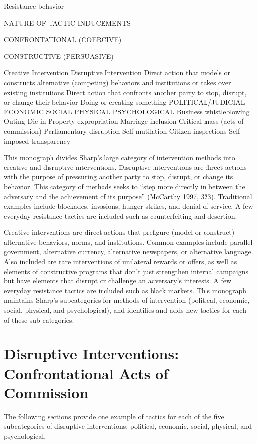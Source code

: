 \documentclass[twoside,a4paper,12pt,fleqn,openany]{extbook}
\begin{document}
Resistance behavior

NATURE OF TACTIC INDUCEMENTS

CONFRONTATIONAL (COERCIVE)

CONSTRUCTIVE (PERSUASIVE)

Creative Intervention
Disruptive Intervention
Direct action that models or constructs alternative (competing) behaviors and institutions or takes over existing institutions
Direct action that confronts another party to stop, disrupt, or change their behavior
Doing or creating something
POLITICAL/JUDICIAL
ECONOMIC
SOCIAL
PHYSICAL
PSYCHOLOGICAL
Business whistleblowing
Outing
Die-in
Property expropriation
Marriage inclusion
Critical mass
(acts of commission)
Parliamentary disruption
Self-mutilation
Citizen inspections
Self-imposed transparency

This monograph divides Sharp’s large category of intervention methods into creative and disruptive interventions. Disruptive interventions are direct actions with the purpose of pressuring another party to stop, disrupt, or change its behavior. This category of methods seeks to “step more directly in between the adversary and the achievement of its purpose” (McCarthy 1997, 323). Traditional examples include blockades, invasions, hunger strikes, and denial of service. A few everyday resistance tactics are included such as counterfeiting and desertion.

Creative interventions are direct actions that prefigure (model or construct) alternative behaviors, norms, and institutions. Common examples include parallel government, alternative currency, alternative newspapers, or alternative language. Also included are rare interventions of unilateral rewards or offers, as well as elements of constructive programs that don’t just strengthen internal campaigns but have elements that disrupt or challenge an adversary’s interests. A few everyday resistance tactics are included such as black markets. This monograph maintains Sharp’s subcategories for methods of intervention (political, economic, social, physical, and psychological), and identifies and adds new tactics for each of these sub-categories.

\section*{Disruptive Interventions: Confrontational Acts of Commission}

The following sections provide one example of tactics for each of the five subcategories of disruptive interventions: political, economic, social, physical, and psychological.
\end{document}
